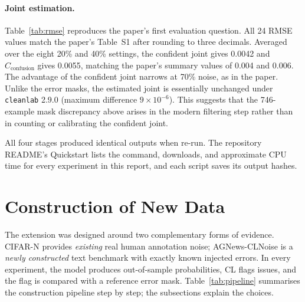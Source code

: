 \documentclass[11pt]{article}
\newcommand{\cleanlab}{\texttt{cleanlab}}
\begin{document}
\paragraph{Joint estimation.} Table~\ref{tab:rmse} reproduces the paper's
first evaluation question. All 24 RMSE values match the paper's Table~S1
after rounding to three decimals. Averaged over the eight 20\% and 40\%
settings, the confident joint gives 0.0042 and $C_{\text{confusion}}$ gives
0.0055, matching the paper's summary values of 0.004 and 0.006. The advantage
of the confident joint narrows at 70\% noise, as in the paper. Unlike the
error masks, the estimated joint is essentially unchanged under \cleanlab{}
2.9.0 (maximum difference $9\times10^{-6}$). This suggests that the 746-example
mask discrepancy above arises in the modern filtering step rather than in
counting or calibrating the confident joint.

All four stages produced identical outputs when re-run. The repository
README's Quickstart lists the command, downloads, and approximate CPU time for
every experiment in this report, and each script saves its output hashes.

\section{Construction of New Data}
\label{sec:new-data}

The extension was designed around two complementary forms of evidence. CIFAR-N
provides \emph{existing} real human annotation noise; AGNews-CLNoise is a
\emph{newly constructed} text benchmark with exactly known injected errors.
In every experiment, the model produces out-of-sample probabilities, CL flags
issues, and the flag is compared with a reference error mask.
Table~\ref{tab:pipeline} summarises the construction pipeline step by step;
the subsections explain the choices.
\end{document}
